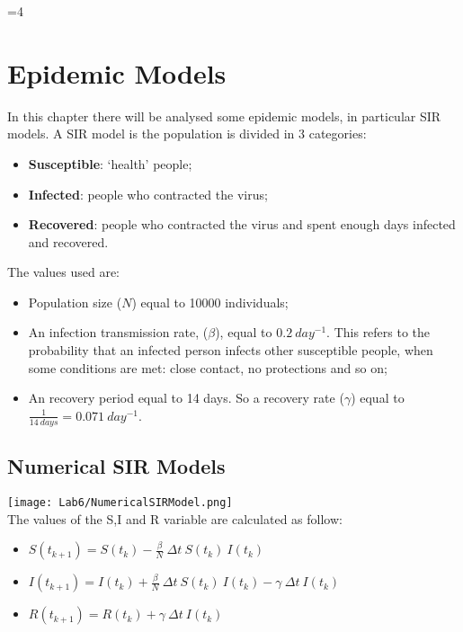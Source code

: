 \documentclass[twocolumn,letterpaper]{report}
\newcounter{debug}
\begin{document}
\ifnum\value{debug}=4 {
    
\chapter{Epidemic Models}
\noindent
	In this chapter there will be analysed some epidemic models, in particular SIR models. A SIR model is the population is divided in 3 categories:
	\begin{itemize}
					\item \textbf{Susceptible}: `health' people;
					\item \textbf{Infected}: people who contracted the virus;
					\item \textbf{Recovered}: people who contracted the virus and spent enough days infected and recovered.
				\end{itemize}
	\noindent
	The values used are:
	\begin{itemize}
					\item Population size ($N$) equal to 10000 individuals;
					\item An infection transmission rate, ($\beta$), equal to $0.2 \: day^{-1}$. This refers to the probability that an infected person infects other susceptible people, when some conditions are met: close contact, no protections and so on;
					\item An recovery period equal to 14 days. So a recovery rate ($\gamma$) equal to $\frac{1}{14 \: days}=0.071 \: day^{-1}$.
				\end{itemize}
				
				
	 \section{Numerical SIR Models}
	 						\texttt{[image: Lab6/NumericalSIRModel.png]} \\
								The values of the S,I and R variable are calculated as follow:
								\begin{itemize}
								  \item[] \hspace{12mm} $S(t_{k+1}) = S(t_{k}) - \frac{\beta}{N} \: \Delta t \: S(t_{k}) \: I(t_{k})$
									\item[] \hspace{12mm} $I(t_{k+1}) = I(t_{k}) + \frac{\beta}{N} \: \Delta t \: S(t_{k}) \: I(t_{k}) - \gamma \: \Delta t \: I(t_k)$
									\item[] \hspace{12mm} $R(t_{k+1}) = R(t_{k}) + \gamma \: \Delta t \: I(t_k)$
								\end{itemize}
								
}
\end{document}
